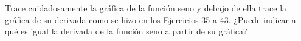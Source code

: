 \item Trace cuidadosamente la gráfica de la función seno y debajo de ella trace la gráfica de su derivada como se hizo en los Ejercicios 35 a 43. ¿Puede indicar a qué es igual la derivada de la función seno a partir de su gráfica?

